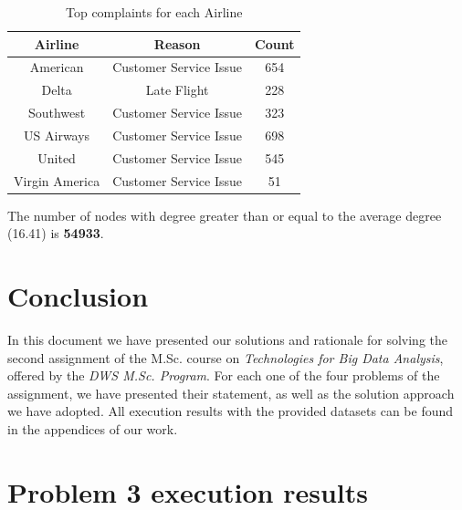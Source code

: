 \documentclass[acmlarge]{acmart}
\begin{document}
  \begin{table}[h!]
    \centering
    \begin{tabular}{|c|c|c|}
      \hline
      \textbf{Airline} & \textbf{Reason} & \textbf{Count} \\ \hline
      American & Customer Service Issue & 654  \\ \hline
      Delta & Late Flight & 228 \\ \hline
      Southwest & Customer Service Issue & 323 \\ \hline
      US Airways & Customer Service Issue & 698 \\ \hline
      United & Customer Service Issue & 545 \\ \hline
      Virgin America & Customer Service Issue & 51 \\ \hline
    \end{tabular}
    \caption{Top complaints for each Airline}
  \end{table}

  The number of nodes with degree greater than or equal to the average degree (16.41) is \textbf{54933}.

  \section{Conclusion}
  \label{sec:conclusion}
  In this document we have presented our solutions and rationale for solving the second assignment of the M.Sc.
  course on \emph{Technologies for Big Data Analysis}, offered by the \emph{DWS M.Sc. Program}. For each one of the four problems of the assignment, we have presented their statement, as well as the solution approach we have adopted. All execution results with the provided datasets can be found in the appendices of our work.

  \newpage
  \appendix

  \section{Problem 3 execution results}
  \label{sec:data3}
  
\end{document}

